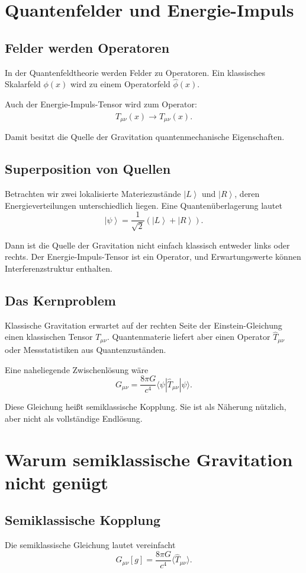 \documentclass[11pt,a4paper,oneside]{book}
\theoremstyle{definition}
\theoremstyle{plain}
\theoremstyle{remark}
\newcommand{\ket}[1]{\left|#1\right\rangle}
\begin{document}
\chapter{Quantenfelder und Energie-Impuls}
\section{Felder werden Operatoren}
In der Quantenfeldtheorie werden Felder zu Operatoren. Ein klassisches Skalarfeld $\phi(x)$ wird zu einem Operatorfeld $\hat\phi(x)$.

Auch der Energie-Impuls-Tensor wird zum Operator:
\[
T_{\mu\nu}(x) \longrightarrow \hat T_{\mu\nu}(x).
\]

Damit besitzt die Quelle der Gravitation quantenmechanische Eigenschaften.

\section{Superposition von Quellen}
Betrachten wir zwei lokalisierte Materiezustände $\ket{L}$ und $\ket{R}$, deren Energieverteilungen unterschiedlich liegen. Eine Quantenüberlagerung lautet
\[
\ket{\psi}=\frac{1}{\sqrt2}(\ket{L}+\ket{R}).
\]

Dann ist die Quelle der Gravitation nicht einfach klassisch entweder links oder rechts. Der Energie-Impuls-Tensor ist ein Operator, und Erwartungswerte können Interferenzstruktur enthalten.

\section{Das Kernproblem}
Klassische Gravitation erwartet auf der rechten Seite der Einstein-Gleichung einen klassischen Tensor $T_{\mu\nu}$. Quantenmaterie liefert aber einen Operator $\hat T_{\mu\nu}$ oder Messstatistiken aus Quantenzuständen.

Eine naheliegende Zwischenlösung wäre
\[
G_{\mu\nu}=\frac{8\pi G}{c^4}\langle\psi|\hat T_{\mu\nu}|\psi\rangle.
\]

Diese Gleichung heißt semiklassische Kopplung. Sie ist als Näherung nützlich, aber nicht als vollständige Endlösung.

\chapter{Warum semiklassische Gravitation nicht genügt}
\section{Semiklassische Kopplung}
Die semiklassische Gleichung lautet vereinfacht
\[
G_{\mu\nu}[g]=\frac{8\pi G}{c^4}\langle \hat T_{\mu\nu}\rangle.
\]
\end{document}
